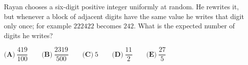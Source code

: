 Rayan chooses a six-digit positive integer uniformly at random. He rewrites it, but whenever a block of adjacent digits have the same value he writes that digit only once; for example $222422$ becomes $242$. What is the expected number of digits he writes?

$\textbf{(A)}\ \dfrac{419}{100}\qquad\textbf{(B)}\ \dfrac{2319}{500}\qquad\textbf{(C)}\ 5\qquad\textbf{(D)}\ \dfrac{11}2\qquad\textbf{(E)}\ \dfrac{27}5$
